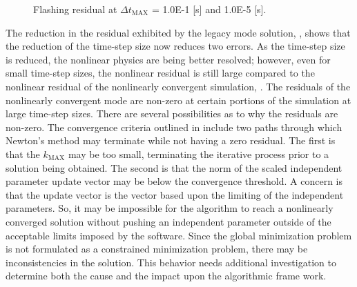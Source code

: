 \begin{figure}[h!t]
\centering
{}
\caption[Flashing residual at $\Delta t_{\text{MAX}}$ = 1.0E-1 {[s]}and 1.0E-5 {[s]}]{Flashing residual at $\Delta t_{\text{MAX}}$ = 1.0E-1 {[s]} and 1.0E-5 {[s]}.}
\label{fig:flashing_compare_2}
\end{figure}

The reduction in the residual exhibited by the legacy mode solution, , shows that the reduction of the time-step size now reduces two errors.
As the time-step size is reduced, the nonlinear physics are being better resolved; however, even for small time-step sizes, the nonlinear residual is still large compared to the nonlinear residual of the nonlinearly convergent simulation, .
The residuals of the nonlinearly convergent \cobra{} mode are non-zero at certain portions of the simulation at large time-step sizes.
There are several possibilities as to why the residuals are non-zero.
The convergence criteria outlined in  include two paths through which Newton's method may terminate while not having a zero residual.
The first is that the $k_{\text{MAX}}$ may be too small, terminating the iterative process prior to a solution being obtained.
The second is that the norm of the scaled independent parameter update vector may be below the convergence threshold.
A concern is that the update vector is the vector based upon the limiting of the independent parameters.
So, it may be impossible for the algorithm to reach a nonlinearly converged solution without pushing an independent parameter outside of the acceptable limits imposed by the software.
Since the global minimization problem is not formulated as a constrained minimization problem, there may be inconsistencies in the solution.
This behavior needs additional investigation to determine both the cause and the impact upon the algorithmic frame work.

